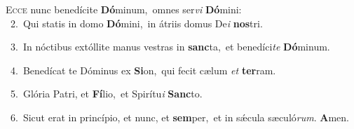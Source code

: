 \lettrine{\initial\textcolor{\initialcolor}{E}}{cce} nunc benedícite \textbf{Dó}\-minum,~\star omnes ser\textit{vi} \textbf{Dó}\-mini:\\
{\numbfont\textcolor{\numbcolor}{~2.}}~Qui statis in domo \textbf{Dó}\-mini,~\star in átriis domus De\textit{i} \textbf{nos}\-tri.\par
{\numbfont\textcolor{\numbcolor}{~3.}}~In nóctibus extóllite manus vestras in \textbf{sanc}\-ta,~\star et benedíci\textit{te} \textbf{Dó}\-minum.\par
{\numbfont\textcolor{\numbcolor}{~4.}}~Benedícat te Dóminus ex \textbf{Si}\-on,~\star qui fecit cælum \textit{et} \textbf{ter}\-ram.\par
{\numbfont\textcolor{\numbcolor}{~5.}}~Glória Patri, et \textbf{Fí}\-lio,~\star et Spirítu\textit{i} \textbf{Sanc}\-to.\par
{\numbfont\textcolor{\numbcolor}{~6.}}~Sicut erat in princípio, et nunc, et \textbf{sem}\-per,~\star et in sǽcula sæculó\-\textit{rum}\-. \textbf{A}\-men.\par
